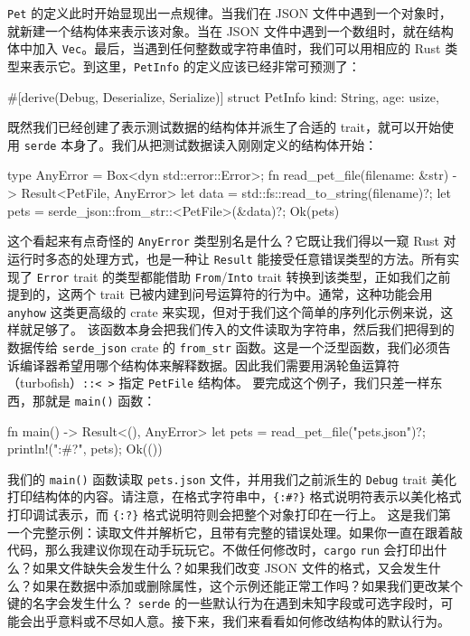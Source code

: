 \label{idx:idx_1e80c2d7}
\label{idx:idx_952519a3}
\texttt{Pet} 的定义此时开始显现出一点规律。当我们在 JSON 文件中遇到一个对象时，就新建一个结构体来表示该对象。当在 JSON 文件中遇到一个数组时，就在结构体中加入 \texttt{Vec}。最后，当遇到任何整数或字符串值时，我们可以用相应的 Rust 类型来表示它。到这里，\texttt{PetInfo} 的定义应该已经非常可预测了：
\begin{codebox}[rust]
#[derive(Debug, Deserialize, Serialize)]
struct PetInfo {
    kind: String,
    age: usize,
}
\end{codebox}
既然我们已经创建了表示测试数据的结构体并派生了合适的 trait，就可以开始使用 \texttt{serde} 本身了。我们从把测试数据读入刚刚定义的结构体开始：
\begin{codebox}[rust]
type AnyError = Box<dyn std::error::Error>;
fn read_pet_file(filename: &str)
    -> Result<PetFile, AnyError> {
    let data = std::fs::read_to_string(filename)?;
    let pets = serde_json::from_str::<PetFile>(&data)?;
    Ok(pets)
}
\end{codebox}
这个看起来有点奇怪的 \texttt{AnyError} 类型别名是什么？它既让我们得以一窥 Rust 对运行时多态的处理方式，也是一种让 \texttt{Result} 能接受任意错误类型的方法。所有实现了 \texttt{Error} trait 的类型都能借助 \texttt{From}/\texttt{Into} trait 转换到该类型，正如我们之前提到的，这两个 trait 已被内建到问号运算符的行为中。通常，这种功能会用 \texttt{anyhow} 这类更高级的 crate 来实现，但对于我们这个简单的序列化示例来说，这样就足够了。
\label{idx:idx_f958787e}
该函数本身会把我们传入的文件读取为字符串，然后我们把得到的数据传给 \texttt{serde\_json} crate 的 \texttt{from\_str} 函数。这是一个泛型函数，我们必须告诉编译器希望用哪个结构体来解释数据。因此我们需要用涡轮鱼运算符（turbofish）\texttt{::< >} 指定 \texttt{PetFile} 结构体。
\label{idx:idx_2ab5b6df}
要完成这个例子，我们只差一样东西，那就是 \texttt{main()} 函数：
\begin{codebox}[rust]
fn main() -> Result<(), AnyError> {
    let pets = read_pet_file("pets.json")?;
    println!("{:#?}", pets);
    Ok(())
}
\end{codebox}
我们的 \texttt{main()} 函数读取 \texttt{pets.json} 文件，并用我们之前派生的 \texttt{Debug} trait 美化打印结构体的内容。请注意，在格式字符串中，\texttt{\{:\#?\}} 格式说明符表示以美化格式打印调试表示，而 \texttt{\{:?\}} 格式说明符则会把整个对象打印在一行上。
这是我们第一个完整示例：读取文件并解析它，且带有完整的错误处理。如果你一直在跟着敲代码，那么我建议你现在动手玩玩它。不做任何修改时，\texttt{cargo}
\texttt{run} 会打印出什么？如果文件缺失会发生什么？如果我们改变
JSON 文件的格式，又会发生什么？如果在数据中添加或删除属性，这个示例还能正常工作吗？如果我们更改某个键的名字会发生什么？
\texttt{serde} 的一些默认行为在遇到未知字段或可选字段时，可能会出乎意料或不尽如人意。接下来，我们来看看如何修改结构体的默认行为。
